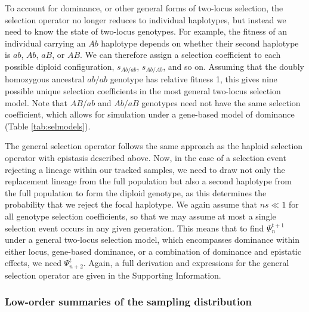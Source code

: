 \documentclass[]{article}
\begin{document}
To account for dominance, or other general forms of two-locus selection, the
selection operator no longer reduces to individual haplotypes, but instead we
need to know the state of two-locus genotypes. For example, the fitness of an
individual carrying an \(Ab\) haplotype depends on whether their second
haplotype is \(ab\), \(Ab\), \(aB\), or \(AB\). We can therefore assign a
selection coefficient to each possible diploid configuration, \(s_{Ab/ab}\),
\(s_{Ab/Ab}\), and so on. Assuming that the doubly homozygous ancestral
\(ab/ab\) genotype has relative fitness 1, this gives nine possible unique
selection coefficients in the most general two-locus selection model. Note that
\(AB/ab\) and \(Ab/aB\) genotypes need not have the same selection coefficient,
which allows for simulation under a gene-based model of dominance (Table
\ref{tab:selmodels}).

The general selection operator follows the same approach as the haploid
selection operator with epistasis described above. Now, in the case of a
selection event rejecting a lineage within our tracked samples, we need to draw
not only the replacement lineage from the full population but also a second
haplotype from the full population to form the diploid genotype, as this
determines the probability that we reject the focal haplotype. We again assume
that \(ns \ll 1\) for all genotype selection coefficients, so that we may
assume at most a single selection event occurs in any given generation. This
means that to find \(\Psi_n^{t+1}\) under a general two-locus selection model,
which encompasses dominance within either locus, gene-based dominance, or a
combination of dominance and epistatic effects, we need \(\Psi_{n+2}^t\).
Again, a full derivation and expressions for the general selection operator are
given in the Supporting Information.

\subsubsection{Low-order summaries of the sampling distribution}
\end{document}
